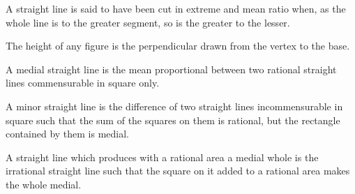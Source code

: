 
\begin{scope}
\label{def:XIII.1}
A straight line is said to have been cut in extreme and mean ratio
when, as the whole line is to the greater segment, so is the greater
to the lesser.
\end{scope}

\begin{scope}
\label{def:XIII.2}
The height of any figure is the perpendicular drawn from the vertex
to the base.
\end{scope}

\begin{scope}
\label{def:XIII.3}
A medial straight line is the mean proportional between two rational
straight lines commensurable in square only.
\end{scope}

\begin{scope}
\label{def:XIII.4}
A minor straight line is the difference of two straight lines
incommensurable in square such that the sum of the squares on them
is rational, but the rectangle contained by them is medial.
\end{scope}

\begin{scope}
\label{def:XIII.5}
A straight line which produces with a rational area a medial whole
is the irrational straight line such that the square on it added to
a rational area makes the whole medial.
\end{scope}
